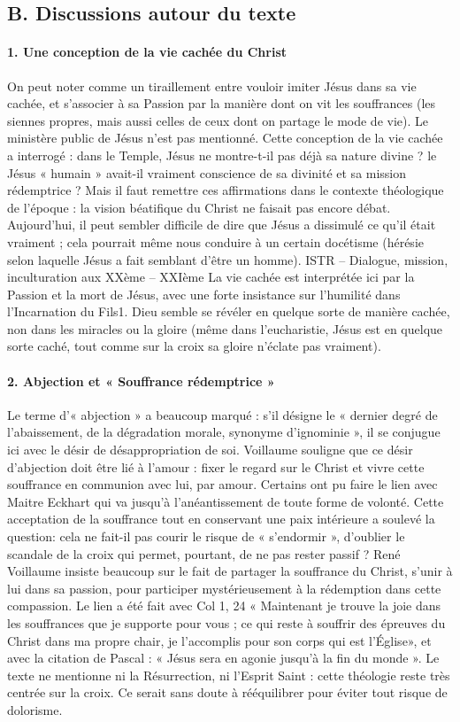 \subsection{B. Discussions autour du texte}

\paragraph{1. Une conception de la vie cachée du Christ}
On peut noter comme un tiraillement entre vouloir imiter Jésus dans sa vie cachée, et s’associer à sa Passion par la manière dont on vit les souffrances (les siennes propres, mais aussi celles de ceux dont on partage le mode de vie). Le ministère public de Jésus n’est pas mentionné. Cette conception de la vie cachée a interrogé : dans le Temple, Jésus ne montre-t-il pas déjà sa nature divine ? le Jésus « humain » avait-il vraiment conscience de sa divinité et sa mission rédemptrice ? Mais il faut remettre ces affirmations dans le contexte théologique de l’époque : la vision béatifique du Christ ne faisait pas encore débat. Aujourd’hui, il peut sembler difficile de dire que Jésus a dissimulé ce qu’il était vraiment ; cela pourrait même nous conduire à un certain docétisme (hérésie selon laquelle Jésus a fait semblant d’être un homme).
ISTR – Dialogue, mission, inculturation aux XXème – XXIème
La vie cachée est interprétée ici par la Passion et la mort de Jésus, avec une forte insistance sur l’humilité dans l’Incarnation du Fils1. Dieu semble se révéler en quelque sorte de manière cachée, non dans les miracles ou la gloire (même dans l’eucharistie, Jésus est en quelque sorte caché, tout comme sur la croix sa gloire n’éclate pas vraiment).

\paragraph{2. Abjection et « Souffrance rédemptrice »
}
Le terme d’« abjection » a beaucoup marqué : s’il désigne le « dernier degré de l’abaissement, de la dégradation morale, synonyme d’ignominie », il se conjugue ici avec le désir de désappropriation de soi. Voillaume souligne que ce désir d’abjection doit être lié à l’amour : fixer le regard sur le Christ et vivre cette souffrance en communion avec lui, par amour. Certains ont pu faire le lien avec Maitre Eckhart qui va jusqu’à l’anéantissement de toute forme de volonté.
Cette acceptation de la souffrance tout en conservant une paix intérieure a soulevé la question: cela ne fait-il pas courir le risque de « s’endormir », d’oublier le scandale de la croix qui permet, pourtant, de ne pas rester passif ?
René Voillaume insiste beaucoup sur le fait de partager la souffrance du Christ, s’unir à lui dans sa passion, pour participer mystérieusement à la rédemption dans cette compassion. Le lien a été fait avec Col 1, 24 « Maintenant je trouve la joie dans les souffrances que je supporte pour vous ; ce qui reste à souffrir des épreuves du Christ dans ma propre chair, je l’accomplis pour son corps qui est l’Église», et avec la citation de Pascal : « Jésus sera en agonie jusqu’à la fin du monde ». Le texte ne mentionne ni la Résurrection, ni l’Esprit Saint : cette théologie reste très centrée sur la croix. Ce serait sans doute à rééquilibrer pour éviter tout risque de dolorisme.
